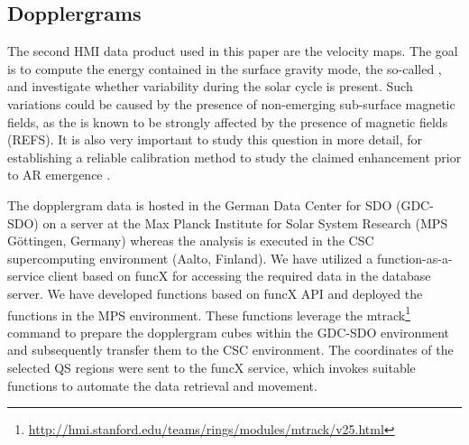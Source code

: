 \documentclass{aa}
\begin{document}
\subsection{Dopplergrams}

The second HMI data product used in this paper are the \los{} velocity maps. The goal is to compute the 
energy contained in the
surface gravity mode, the so-called \fff,
and investigate whether variability during the solar cycle is present. Such variations could be caused by the presence of non-emerging sub-surface magnetic fields, as the \fff is known
to be strongly affected by the presence of magnetic fields (REFS). 
It is also very important to study this question in more detail, for establishing a reliable calibration method to study the claimed 
\fff enhancement prior to AR emergence \cite{SRB16,Waidele22}. 

The dopplergram data is hosted in the German Data Center for SDO (GDC-SDO) on a server at the Max Planck Institute for Solar System Research (MPS Göttingen, Germany) whereas the analysis is executed in the CSC supercomputing environment (Aalto, Finland). We have utilized  a function-as-a-service client based on funcX \cite[]{chard20funcx} for accessing the required data in the database server. We have developed functions based on funcX API and deployed the functions in the MPS environment. These functions leverage the mtrack\footnote{\url{http://hmi.stanford.edu/teams/rings/modules/mtrack/v25.html}} command to prepare the dopplergram cubes within the GDC-SDO environment and subsequently transfer them to the CSC environment. The coordinates of the selected 
QS
regions were sent to the funcX service, which invokes suitable functions to automate the data retrieval and movement.


%
\end{document}
